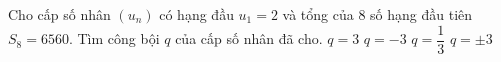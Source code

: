 \begin{ex}%
 Cho cấp số nhân $(u_n)$ có hạng đầu $u_1=2$ và tổng của $8$ số hạng đầu tiên $S_8=6560$. Tìm công bội $q$ của cấp số nhân đã cho.
 \choice
 {\True $q=3$}
 {$q=-3$}
 {$q=\dfrac{1}{3}$}
 {$q=\pm 3$}
\end{ex}
